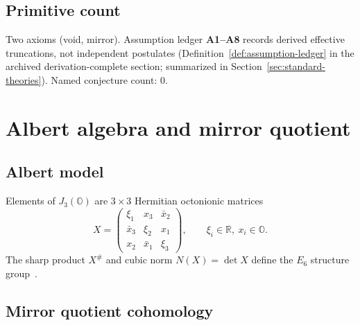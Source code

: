 \documentclass[11pt]{article}
\theoremstyle{plain}
\theoremstyle{definition}
\theoremstyle{remark}
\numberwithin{equation}{section}
\newcommand{\R}{\mathbb{R}}
\newcommand{\Oct}{\mathbb{O}}
\newcommand{\jalg}{J_3(\mathbb{O})}
\begin{document}
\subsection{Primitive count}

Two axioms (void, mirror). Assumption ledger \textbf{A1--A8} records derived
effective truncations, not independent postulates
(Definition~\ref{def:assumption-ledger} in the archived derivation-complete
section; summarized in Section~\ref{sec:standard-theories}). Named
conjecture count: $0$.%
\appendix
\section{Albert algebra and mirror quotient}
\label{sec:appendix}

\subsection{Albert model}
\label{sec:appendix:albert}

Elements of $\jalg$ are $3\times3$ Hermitian octonionic matrices
\begin{equation}\label{eq:matrix}
  X=\begin{pmatrix}
    \xi_1 & x_3 & \bar x_2\\
    \bar x_3 & \xi_2 & x_1\\
    x_2 & \bar x_1 & \xi_3
  \end{pmatrix},
  \qquad \xi_i\in\R,\ x_i\in\Oct.
\end{equation}
The sharp product $X^{\#}$ and cubic norm $N(X)=\det X$ define the $E_6$
structure group~\cite{SpringerVeldkamp2000,Jacobson1968}.

\subsection{Mirror quotient cohomology}
\label{sec:appendix:quotient}
\end{document}
